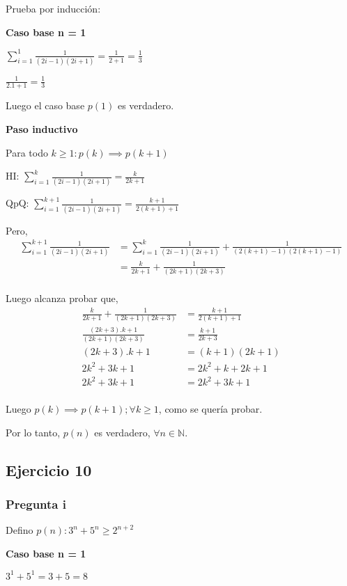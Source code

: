 Prueba por inducción:

\textbf{Caso base n = 1}

$ \sum_{i=1}^{1}\frac{1}{(2i-1)(2i+1)} = \frac{1}{2+1} = \frac{1}{3}$

$ \frac{1}{2.1+1} = \frac{1}{3}$

Luego el caso base $p(1)$ es verdadero.

\textbf{Paso inductivo}

Para todo $k \geq 1: p(k) \implies p(k+1)$

HI: $\sum_{i=1}^{k}\frac{1}{(2i-1)(2i+1)} = \frac{k}{2k+1}$

QpQ: $\sum_{i=1}^{k+1}\frac{1}{(2i-1)(2i+1)} = \frac{k+1}{2(k+1)+1}$

Pero,
\begin{align*}
    \sum_{i=1}^{k+1}\frac{1}{(2i-1)(2i+1)} &= \sum_{i=1}^{k}\frac{1}{(2i-1)(2i+1)} + \frac{1}{(2(k+1)-1)(2(k+1)-1)} \\
    &= \frac{k}{2k+1} + \frac{1}{(2k+1)(2k+3)} \\
\end{align*}

Luego alcanza probar que,
\begin{align*}
    \frac{k}{2k+1} + \frac{1}{(2k+1)(2k+3)} &= \frac{k+1}{2(k+1)+1} \\
    \frac{(2k+3).k + 1}{(2k+1)(2k+3)} &= \frac{k+1}{2k+3} \\
    (2k+3).k + 1 &= (k+1)(2k+1) \\
    2k^2 + 3k + 1 &= 2k^2 + k + 2k +1 \\
    2k^2 + 3k + 1 &= 2k^2 + 3k +1 \\
\end{align*}

Luego $p(k) \implies p(k+1); \forall k \geq 1$, como se quería probar.

Por lo tanto, $p(n)$ es verdadero, $\forall n \in \mathbb{N}$.

\subsection{Ejercicio 10}

\subsubsection{Pregunta i}

Defino $ p(n): 3^n + 5^n \geq 2^{n+2}$

\textbf{Caso base n = 1}

$3^1 + 5^1 = 3 + 5 = 8$

